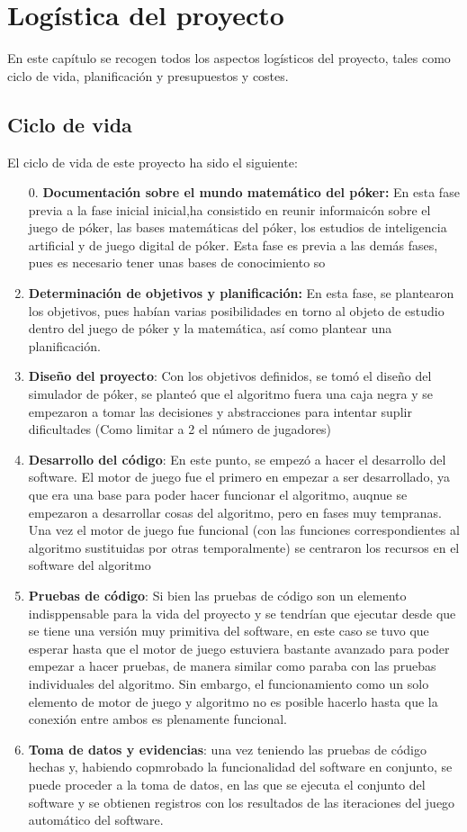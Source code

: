 \chapter{Logística del proyecto}

En este capítulo se recogen todos los aspectos logísticos del proyecto, tales como ciclo de vida, planificación y presupuestos y costes.

\section{Ciclo de vida}

El ciclo de vida de este proyecto ha sido el siguiente:
\begin{enumerate}
\item[0.] \textbf{Documentación sobre el mundo matemático del póker:} En esta fase previa a la fase inicial inicial,ha consistido en reunir informaicón sobre el juego de póker, las bases matemáticas del póker, los estudios de inteligencia artificial y de juego digital de póker. Esta fase es previa a las demás fases, pues es necesario tener unas bases de conocimiento so
\item \textbf{Determinación de objetivos y planificación:} En esta fase, se plantearon los objetivos, pues habían varias posibilidades en torno al objeto de estudio dentro del juego de póker y la matemática, así como plantear una planificación.
\item \textbf{Diseño del proyecto}: Con los objetivos definidos, se tomó el diseño del simulador de póker, se planteó que el algoritmo fuera una caja negra y se empezaron a tomar las decisiones y abstracciones para intentar suplir dificultades (Como limitar a 2 el número de jugadores)
\item \textbf{Desarrollo del código}: En este punto, se empezó a hacer el desarrollo del software. El motor de juego fue el primero en empezar a ser desarrollado, ya que era una base para poder hacer funcionar el algoritmo, auqnue se empezaron a desarrollar cosas del algoritmo, pero en fases muy tempranas. Una vez el motor de juego fue funcional (con las funciones correspondientes al algoritmo sustituidas por otras temporalmente) se centraron los recursos en el software del algoritmo
\item \textbf{Pruebas de código}: Si bien las pruebas de código son un elemento indisppensable para la vida del proyecto y se tendrían que ejecutar desde que se tiene una versión muy primitiva del software, en este caso se tuvo que esperar hasta que el motor de juego estuviera bastante avanzado para poder empezar a hacer pruebas, de manera similar como paraba con las pruebas individuales del algoritmo. Sin embargo, el funcionamiento como un solo elemento de motor de juego y algoritmo no es posible hacerlo hasta que la conexión entre ambos es plenamente funcional.
\item \textbf{Toma de datos y evidencias}: una vez teniendo las pruebas de código hechas y, habiendo copmrobado la funcionalidad del software en conjunto, se puede proceder a la toma de datos, en las que se ejecuta el conjunto del software y se obtienen registros con los resultados de las iteraciones del juego automático del software.
\end{enumerate}


